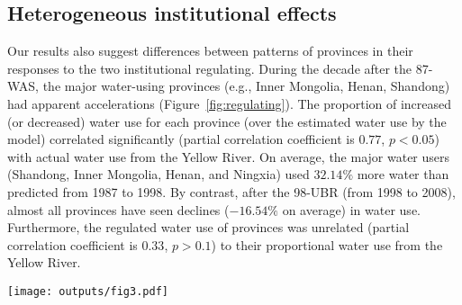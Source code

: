 \subsection{Heterogeneous institutional effects}
\label{result-3}
Our results also suggest differences between patterns of provinces in their responses to the two institutional regulating.
During the decade after the 87-WAS, the major water-using provinces (e.g., Inner Mongolia, Henan, Shandong) had apparent accelerations (Figure~\ref{fig:regulating}).
The proportion of increased (or decreased) water use for each province (over the estimated water use by the model) correlated significantly (partial correlation coefficient is $0.77$, $p<0.05$) with actual water use from the Yellow River.
On average, the major water users (Shandong, Inner Mongolia, Henan, and Ningxia) used $32.14\%$ more water than predicted from 1987 to 1998.
By contrast, after the 98-UBR (from 1998 to 2008), almost all provinces have seen declines ($-16.54\%$ on average) in water use.
Furthermore, the regulated water use of provinces was unrelated (partial correlation coefficient is $0.33$, $p>0.1$) to their proportional water use from the Yellow River.

\begin{figure*}[!tb]
    \centering
    \texttt{[image: outputs/fig3.pdf]}
    \caption{
        Regulating differences for provinces in the YRB.
        Red (the 87-WAS) and green (the 98-UBR) bars denote an increased or decreased ratio for actual water use relative to the estimate from the model in the decade after the institutional shift.
        The grey bars indicate the proportions of actual water use for each province relative to their total water use in the decade after the institutional shift.
        The triangles mark the water quotas assigned under the institution, converted to ratios by dividing by their sum.
    }
    \label{fig:regulating}
\end{figure*}

